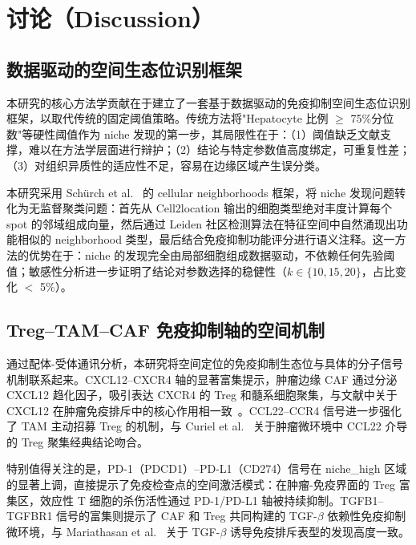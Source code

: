 \documentclass[12pt, a4paper]{ctexart}
\begin{document}
\section{讨论（Discussion）}

\subsection{数据驱动的空间生态位识别框架}

本研究的核心方法学贡献在于建立了一套基于数据驱动的免疫抑制空间生态位识别框架，以取代传统的固定阈值策略。传统方法将"Hepatocyte 比例 $\geq$ 75\%分位数"等硬性阈值作为 niche 发现的第一步，其局限性在于：（1）阈值缺乏文献支撑，难以在方法学层面进行辩护；（2）结论与特定参数值高度绑定，可重复性差；（3）对组织异质性的适应性不足，容易在边缘区域产生误分类。

本研究采用 Schürch et al.~\cite{schurch2020coordinated} 的 cellular neighborhoods 框架，将 niche 发现问题转化为无监督聚类问题：首先从 Cell2location 输出的细胞类型绝对丰度计算每个 spot 的邻域组成向量，然后通过 Leiden 社区检测算法在特征空间中自然涌现出功能相似的 neighborhood 类型，最后结合免疫抑制功能评分进行语义注释。这一方法的优势在于：niche 的发现完全由局部细胞组成数据驱动，不依赖任何先验阈值；敏感性分析进一步证明了结论对参数选择的稳健性（$k \in \{10,15,20\}$，占比变化 $<$ 5\%）。

\subsection{Treg--TAM--CAF 免疫抑制轴的空间机制}

通过配体-受体通讯分析，本研究将空间定位的免疫抑制生态位与具体的分子信号机制联系起来。CXCL12--CXCR4 轴的显著富集提示，肿瘤边缘 CAF 通过分泌 CXCL12 趋化因子，吸引表达 CXCR4 的 Treg 和髓系细胞聚集，与文献中关于 CXCL12 在肿瘤免疫排斥中的核心作用相一致~\cite{domanska2013targeting}。CCL22--CCR4 信号进一步强化了 TAM 主动招募 Treg 的机制，与 Curiel et al.~\cite{curiel2004specific} 关于肿瘤微环境中 CCL22 介导的 Treg 聚集经典结论吻合。

特别值得关注的是，PD-1（PDCD1）--PD-L1（CD274）信号在 niche\_high 区域的显著上调，直接提示了免疫检查点的空间激活模式：在肿瘤-免疫界面的 Treg 富集区，效应性 T 细胞的杀伤活性通过 PD-1/PD-L1 轴被持续抑制。TGFB1--TGFBR1 信号的富集则提示了 CAF 和 Treg 共同构建的 TGF-$\beta$ 依赖性免疫抑制微环境，与 Mariathasan et al.~\cite{mariathasan2018tgfb} 关于 TGF-$\beta$ 诱导免疫排斥表型的发现高度一致。
\end{document}
